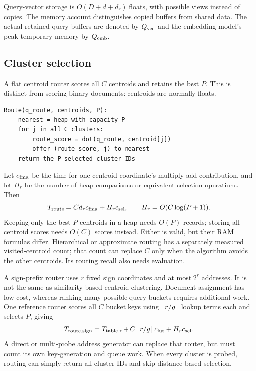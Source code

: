 Query-vector storage is $O(D+d+d_r)$ floats, with possible views instead of copies. The memory account distinguishes copied buffers from shared data. The actual retained query buffers are denoted by $Q_{\rm vec}$ and the
embedding model's peak temporary memory by $Q_{\rm emb}$.

\subsection{Cluster selection}
A flat centroid router scores all $C$ centroids and retains the best $P$. This is distinct
from scoring binary documents: centroids are normally floats.
\par\noindent\begin{minipage}{\linewidth}
\begin{lstlisting}[caption={A simple flat centroid router with bounded selection memory.}]
Route(q_route, centroids, P):
    nearest = heap with capacity P
    for j in all C clusters:
        route_score = dot(q_route, centroid[j])
        offer (route_score, j) to nearest
    return the P selected cluster IDs
\end{lstlisting}
\end{minipage}\par
Let $c_{\rm fma}$ be the time for one centroid coordinate's multiply-add contribution, and let
$H_r$ be the number of heap comparisons or equivalent selection operations. Then
\begin{equation}
T_{\rm route}=C d_r c_{\rm fma}+H_r c_{\rm sel},\qquad
H_r=O(C\log(P+1)).
\label{eq:route}
\end{equation}
Keeping only the best $P$ centroids in a heap needs $O(P)$ records; storing all centroid scores needs $O(C)$ scores
instead. Either is valid, but their RAM formulas differ. Hierarchical or approximate routing
has a separately measured visited-centroid count; that count can replace $C$ only when the algorithm
avoids the other centroids. Its routing recall also needs evaluation.

A sign-prefix router uses $r$ fixed sign coordinates and at most $2^r$ addresses. It is not the
same as similarity-based centroid clustering. Document assignment has low cost, whereas ranking many
possible query buckets requires additional work. One reference router scores all $C$ bucket keys using
$\left\lceil r/g\right\rceil$ lookup terms each and selects $P$, giving
\[
T_{\rm route,sign}=T_{\rm table,r}+C\left\lceil r/g\right\rceil c_{\rm lut}+H_r c_{\rm sel}.
\]
A direct or multi-probe address generator can replace that router, but must count its own
key-generation and queue work. When every cluster is probed, routing can simply return all
cluster IDs and skip distance-based selection.

